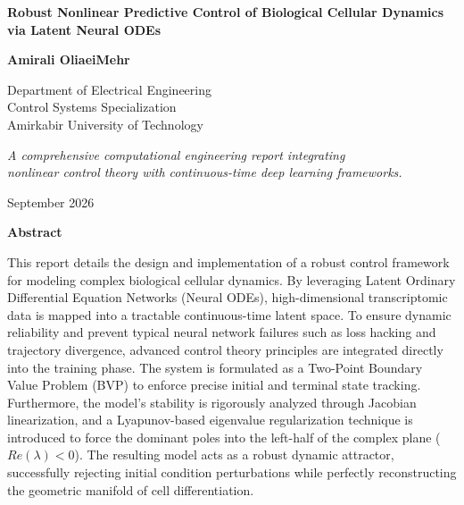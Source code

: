 \documentclass[12pt, a4paper]{article}
\begin{document}
	
	\begin{titlepage}
		\centering
		\vspace*{2cm}
		
		\Huge
		\textbf{Robust Nonlinear Predictive Control of Biological Cellular Dynamics via Latent Neural ODEs}
		
		\vspace{2cm}
		
		\LARGE
		\textbf{Amirali OliaeiMehr}
		
		\vspace{1.5cm}
		
		\Large
		Department of Electrical Engineering\\
		Control Systems Specialization\\
		Amirkabir University of Technology
		
		\vspace{3cm}
		
		\large
		\textit{A comprehensive computational engineering report integrating \\ nonlinear control theory with continuous-time deep learning frameworks.}
		
		\vfill
		September 2026
		\Large
		\
	\end{titlepage}
	
	\newpage
	\thispagestyle{plain}
	\begin{center}
		\Large \textbf{Abstract}
	\end{center}
	\vspace{0.5cm}
	
	\noindent This report details the design and implementation of a robust control framework for modeling complex biological cellular dynamics. By leveraging Latent Ordinary Differential Equation Networks (Neural ODEs), high-dimensional transcriptomic data is mapped into a tractable continuous-time latent space. To ensure dynamic reliability and prevent typical neural network failures such as loss hacking and trajectory divergence, advanced control theory principles are integrated directly into the training phase. The system is formulated as a Two-Point Boundary Value Problem (BVP) to enforce precise initial and terminal state tracking. Furthermore, the model's stability is rigorously analyzed through Jacobian linearization, and a Lyapunov-based eigenvalue regularization technique is introduced to force the dominant poles into the left-half of the complex plane ($Re(\lambda) < 0$). The resulting model acts as a robust dynamic attractor, successfully rejecting initial condition perturbations while perfectly reconstructing the geometric manifold of cell differentiation.
	
\end{document}
